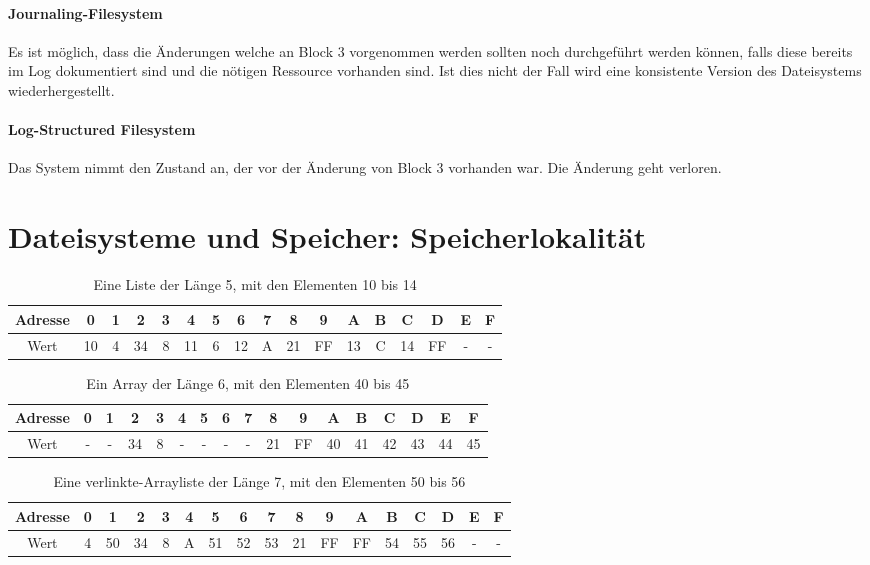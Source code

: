 \documentclass[a4paper]{article}
\begin{document}
\paragraph{Journaling-Filesystem}
Es ist möglich, dass die Änderungen welche an Block 3 vorgenommen werden sollten noch durchgeführt werden können, falls diese bereits im Log dokumentiert sind und die nötigen Ressource vorhanden sind. Ist dies nicht der Fall wird eine konsistente Version des Dateisystems wiederhergestellt.

\paragraph{Log-Structured Filesystem}
Das System nimmt den Zustand an, der vor der Änderung von Block 3 vorhanden war. Die Änderung geht verloren.

\section{Dateisysteme und Speicher: Speicherlokalität}
\begin{table}[H]
    \centering
    \begin{tabular}{c c c c c c c c c c c c c c c c c}
         \toprule
         Adresse & 0 & 1 & 2 & 3 & 4 & 5 & 6 & 7 & 8 & 9 & A & B & C & D & E & F  \\
         \midrule
         Wert & 10 & 4 & 34 & 8 & 11 & 6 & 12 & A & 21 & FF & 13 & C & 14 & FF & - & -\\
         \bottomrule
    \end{tabular}
    \caption{Eine Liste der Länge 5, mit den Elementen 10 bis 14}
    \label{tab:my_label}
\end{table}

\begin{table}[H]
    \centering
    \begin{tabular}{c c c c c c c c c c c c c c c c c}
         \toprule
         Adresse & 0 & 1 & 2 & 3 & 4 & 5 & 6 & 7 & 8 & 9 & A & B & C & D & E & F  \\
         \midrule
         Wert & - & - & 34 & 8 & - & - & - & - & 21 & FF & 40 & 41 & 42 & 43 & 44 & 45\\
         \bottomrule
    \end{tabular}
    \caption{Ein Array der Länge 6, mit den Elementen 40 bis 45}
    \label{tab:my_label}
\end{table}

\begin{table}[H]
    \centering
    \begin{tabular}{c c c c c c c c c c c c c c c c c}
         \toprule
         Adresse & 0 & 1 & 2 & 3 & 4 & 5 & 6 & 7 & 8 & 9 & A & B & C & D & E & F  \\
         \midrule
         Wert & 4 & 50  & 34 & 8 & A  & 51 &  52 &  53 & 21 & FF & FF & 54  & 55 & 56 & - & -\\
         \bottomrule
    \end{tabular}
    \caption{Eine verlinkte-Arrayliste der Länge 7, mit den Elementen 50 bis 56}
    \label{tab:my_label}
\end{table}
\end{document}
